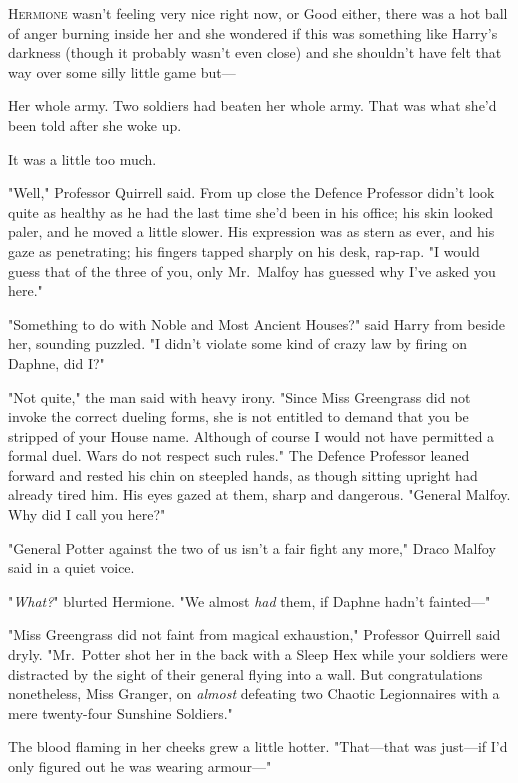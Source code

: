 
\lettrine{H}{ermione} wasn't
feeling very nice right now, or Good either, there was a hot ball of anger
burning inside her and she wondered if this was something like Harry's darkness
(though it probably wasn't even close) and she shouldn't have felt that way
over some silly little game but---

Her whole army. Two soldiers had beaten her whole army. That was what she'd
been told after she woke up.

It was a little too much.

"Well," Professor Quirrell said. From up close the Defence Professor didn't
look quite as healthy as he had the last time she'd been in his office; his
skin looked paler, and he moved a little slower. His expression was as stern as
ever, and his gaze as penetrating; his fingers tapped sharply on his desk,
rap-rap. "I would guess that of the three of you, only Mr.~Malfoy has guessed
why I've asked you here."

"Something to do with Noble and Most Ancient Houses?" said Harry from beside
her, sounding puzzled. "I didn't violate some kind of crazy law by firing on
Daphne, did I?"

"Not quite," the man said with heavy irony. "Since Miss Greengrass did not
invoke the correct dueling forms, she is not entitled to demand that you be
stripped of your House name. Although of course I would not have permitted a
formal duel. Wars do not respect such rules." The Defence Professor leaned
forward and rested his chin on steepled hands, as though sitting upright had
already tired him. His eyes gazed at them, sharp and dangerous. "General
Malfoy. Why did I call you here?"

"General Potter against the two of us isn't a fair fight any more," Draco Malfoy
said in a quiet voice.

"\emph{What?}" blurted Hermione. "We almost \emph{had} them, if Daphne hadn't
fainted---"

"Miss Greengrass did not faint from magical exhaustion," Professor Quirrell
said dryly. "Mr.~Potter shot her in the back with a Sleep Hex while your
soldiers were distracted by the sight of their general flying into a wall. But
congratulations nonetheless, Miss Granger, on \emph{almost} defeating two
Chaotic Legionnaires with a mere twenty-four Sunshine Soldiers."

The blood flaming in her cheeks grew a little hotter. "That---that was
just---if I'd only figured out he was wearing armour---"

